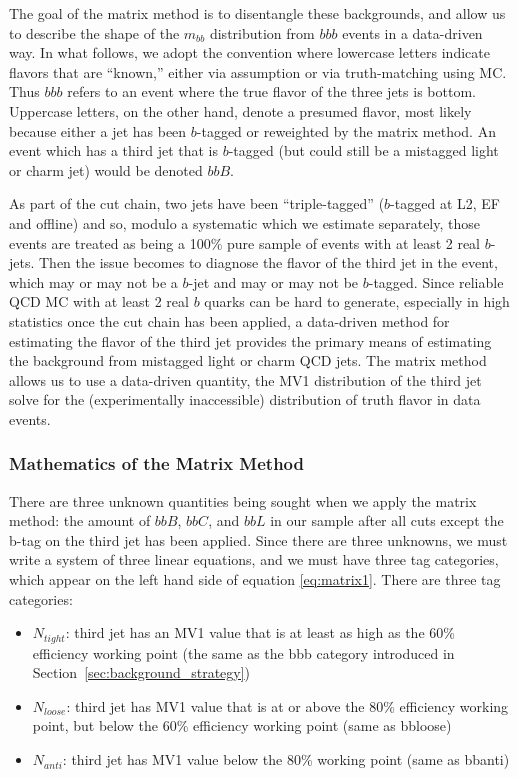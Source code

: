 The goal of the matrix method is to disentangle these backgrounds, and allow us to describe the shape of the $m_{bb}$ distribution from $bbb$ events
in a data-driven way.  In what follows, we adopt the convention where lowercase letters indicate flavors
that are ``known,'' either via assumption or via truth-matching using MC.  Thus $bbb$ refers to an event where the true flavor of the three jets is bottom.  Uppercase letters,
on the other hand, denote a presumed flavor, most likely because either a jet has been $b$-tagged or reweighted by the matrix method.  An event which has a third jet
that is $b$-tagged (but could still be a mistagged light or charm jet) would be
denoted $bbB$.  

As part of the cut chain, two jets have been ``triple-tagged'' ($b$-tagged
at L2, EF and offline) and so, modulo a systematic which we estimate separately, 
those events are treated as being a 100\% pure sample of events with at least 2 real $b$-jets.
Then the issue becomes to diagnose the flavor of the third jet in the event,
which may or may not be a $b$-jet and may or may not be $b$-tagged.  Since
reliable QCD MC with at least 2 real $b$ quarks can be hard to generate, especially
in high statistics once the cut chain has been applied, a data-driven method for
estimating the flavor of the third jet provides the primary means of estimating
the background from mistagged light or charm QCD jets.  The matrix method allows
us to use a data-driven quantity, the MV1 distribution of the third jet
solve for the (experimentally inaccessible) distribution of truth flavor in data events.

\subsubsection{Mathematics of the Matrix Method}
There are three unknown quantities being sought when we apply the matrix method: the amount of $bbB$, $bbC$, and $bbL$ in our sample after all cuts except the b-tag on the third jet has been applied.   Since there are three unknowns, we must write a system of three linear equations, and we must have three tag categories, which appear on the left hand side of equation \ref{eq:matrix1}.  There are three tag categories:
	
	\begin{itemize}
		\item $N_{tight}$: third jet has an MV1 value that is at least as high as the 60\% efficiency working point (the same as the bbb category introduced in Section~\ref{sec:background_strategy})
		\item $N_{loose}$: third jet has MV1 value that is at or above the 80\% efficiency working point, but below the 60\% efficiency working point (same as bbloose)
		\item $N_{anti}$: third jet has MV1 value below the 80\% working point (same as bbanti)
	\end{itemize}

